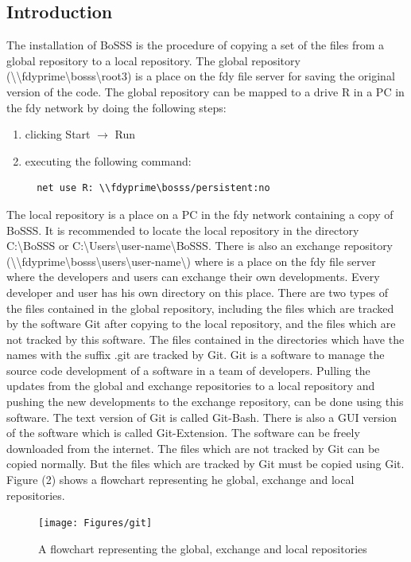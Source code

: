 \documentclass[11pt,twoside,a4paper]{fdyartcl}
\begin{document}
\subsection{Introduction}
The installation of BoSSS is the procedure of copying a set of the files from a global repository to a local repository. The global repository ({\scriptsize \textbackslash\textbackslash fdyprime\textbackslash bosss\textbackslash root3}) is a place on the fdy file server for saving the original version of the code. The global repository can be mapped to a drive {\scriptsize R} in a PC in the fdy network by doing the following steps:
\begin{enumerate}
\item clicking {\scriptsize Start $\rightarrow$ Run}
\item executing the following command:
{\scriptsize \begin{verbatim}
  net use R: \\fdyprime\bosss/persistent:no
\end{verbatim}}
\end{enumerate}
The local repository is a place on a PC in the fdy network containing a copy of BoSSS. It is recommended to locate the local repository in the directory {\scriptsize C:\textbackslash BoSSS} or {\scriptsize C:\textbackslash Users\textbackslash user-name\textbackslash BoSSS}. There is also an exchange repository ({\scriptsize \textbackslash\textbackslash fdyprime\textbackslash bosss\textbackslash users\textbackslash user-name\textbackslash}) where is a place on the fdy file server where the developers and users can exchange their own developments. Every developer and user has his own directory on this place. There are two types of the files contained in the global repository, including the files which are tracked by the software Git after copying to the local repository, and the files which are not tracked by this software. The files contained in the directories which have the names with the suffix {\scriptsize .git} are tracked by Git. Git is a software to manage the source code development of a software in a team of developers. Pulling the updates from the global and exchange repositories to a local repository and pushing the new developments to the exchange repository, can be done using this software. The text version of Git is called Git-Bash. There is also a GUI version of the software which is called Git-Extension. The software can be freely downloaded from the internet. The files which are not tracked by Git can be copied normally. But the files which are tracked by Git must be copied using Git. Figure (2) shows a flowchart representing he global, exchange and local repositories.
\begin{figure}[h] %
  \begin{centering}
  \texttt{[image: Figures/git]}\\
  \end{centering}
  \caption{A flowchart representing the global, exchange and local repositories}
  \label{git-structure}
\end{figure}
\end{document}
